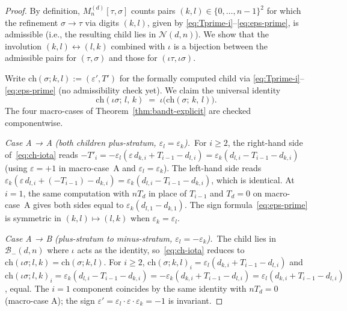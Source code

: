 \documentclass{amsart}
\theoremstyle{definition}
\theoremstyle{remark}
\begin{document}
\begin{proof}
By definition, $M_n^{(d)}[\tau, \sigma]$ counts pairs
$(k, l) \in \{0, \ldots, n-1\}^2$ for which the refinement
$\sigma \to \tau$ via digits $(k, l)$, given by
\eqref{eq:Tprime-i}--\eqref{eq:eps-prime}, is admissible (i.e.,
the resulting child lies in $\mathcal{N}(d, n)$).
We show that the involution $(k, l) \leftrightarrow (l, k)$
combined with $\iota$ is a bijection between the admissible
pairs for $(\tau, \sigma)$ and those for
$(\iota\tau, \iota\sigma)$.

Write $\mathrm{ch}(\sigma; k, l) := (\varepsilon', T')$ for the
formally computed child via
\eqref{eq:Tprime-i}--\eqref{eq:eps-prime} (no admissibility
check yet).  We claim the universal identity
\begin{equation}\label{eq:ch-iota}
  \mathrm{ch}(\iota\sigma;\, l,\, k)
  \;=\; \iota\bigl(\mathrm{ch}(\sigma;\, k,\, l)\bigr).
\end{equation}
The four macro-cases of
Theorem~\ref{thm:bandt-explicit} are checked componentwise.

\smallskip
\textit{Case A → A} \emph{(both children plus-stratum,
$\varepsilon_l = \varepsilon_k$).}\
For $i \ge 2$, the right-hand side of~\eqref{eq:ch-iota} reads
$-T'_i = -\varepsilon_l(\varepsilon\, d_{k, i} + T_{i-1}
- d_{l, i}) = \varepsilon_k(d_{l, i} - T_{i-1} - d_{k, i})$
(using $\varepsilon = +1$ in macro-case~A and
$\varepsilon_l = \varepsilon_k$).  The left-hand side reads
$\varepsilon_k(\varepsilon\, d_{l, i} + (-T_{i-1}) - d_{k, i})
= \varepsilon_k(d_{l, i} - T_{i-1} - d_{k, i})$, which is
identical.  At $i = 1$, the same computation with $n T_d$ in
place of $T_{i-1}$ and $T_d = 0$ on macro-case~A gives both
sides equal to $\varepsilon_k(d_{l, 1} - d_{k, 1})$.  The sign
formula~\eqref{eq:eps-prime} is symmetric in $(k, l) \mapsto
(l, k)$ when $\varepsilon_k = \varepsilon_l$.

\smallskip
\textit{Case A → B} \emph{(plus-stratum to minus-stratum,
$\varepsilon_l = -\varepsilon_k$).}\
The child lies in $\mathcal{B}_-(d, n)$ where $\iota$ acts as
the identity, so~\eqref{eq:ch-iota} reduces to
$\mathrm{ch}(\iota\sigma; l, k) = \mathrm{ch}(\sigma; k, l)$.
For $i \ge 2$, $\mathrm{ch}(\sigma; k, l)_i = \varepsilon_l(d_{k, i}
+ T_{i-1} - d_{l, i})$ and $\mathrm{ch}(\iota\sigma; l, k)_i
= \varepsilon_k(d_{l, i} - T_{i-1} - d_{k, i})
= -\varepsilon_k(d_{k, i} + T_{i-1} - d_{l, i})
= \varepsilon_l(d_{k, i} + T_{i-1} - d_{l, i})$, equal.  The
$i = 1$ component coincides by the same identity with $n T_d
= 0$ (macro-case A); the sign $\varepsilon' = \varepsilon_l \cdot
\varepsilon \cdot \varepsilon_k = -1$ is invariant.


\end{proof}
\end{document}
